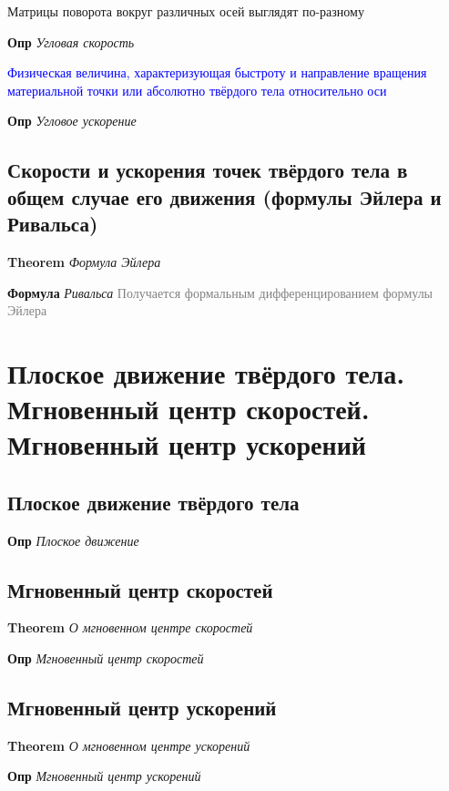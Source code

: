 \documentclass[a4paper, 14pt]{article}
\begin{document}
    Матрицы поворота вокруг различных осей выглядят по-разному
    
    \textbf{Опр} \textit{Угловая скорость}
    
    \textcolor{blue}{Физическая величина, характеризующая быстроту и направление вращения материальной точки или
    абсолютно твёрдого тела относительно оси}
    
    \textbf{Опр} \textit{Угловое ускорение}
    
    \subsection{Скорости и ускорения точек твёрдого тела в общем случае его движения (формулы Эйлера и Ривальса)}
    
    \textbf{Theorem} \textit{Формула Эйлера}
    
    \textbf{Формула} \textit{Ривальса} \textcolor{gray}{Получается формальным дифференцированием формулы Эйлера}
    
    \section{Плоское движение твёрдого тела.
    Мгновенный центр скоростей.
    Мгновенный центр ускорений}
    
    \subsection{Плоское движение твёрдого тела}
    
    \textbf{Опр} \textit{Плоское движение}
    
    \subsection{Мгновенный центр скоростей}
    
    \textbf{Theorem} \textit{О мгновенном центре скоростей}
    
    \textbf{Опр} \textit{Мгновенный центр скоростей}
    
    \subsection{Мгновенный центр ускорений}
    
    \textbf{Theorem} \textit{О мгновенном центре ускорений}
    
    \textbf{Опр} \textit{Мгновенный центр ускорений}
    
\end{document}

